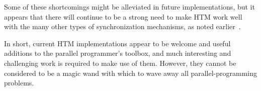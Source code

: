Some of these shortcomings might be alleviated in future implementations,
but it appears that there will continue to be a strong need to make
HTM work well with the many other types of synchronization mechanisms,
as noted earlier~\cite{McKenney2007PLOSTM,PaulEMcKenney2010OSRGrassGreener}.

In short, current HTM implementations appear to be welcome and useful
additions to the parallel programmer's toolbox, and much interesting
and challenging work is required to make use of them.
However, they cannot be
considered to be a magic wand with which to wave away all parallel-programming
problems.
\fi
